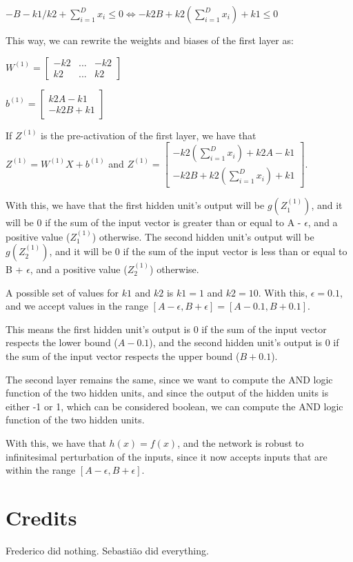 \documentclass{article}
\begin{document}
\bigskip

$ -B - k1/k2 + \sum_{i=1}^{D} x_i \leq 0 \iff -k2B + k2(\sum_{i=1}^{D} x_i) + k1 \leq 0$

\bigskip

This way, we can rewrite the weights and biases of the first layer as:

\bigskip

\( W^{(1)} = \begin{bmatrix}
    -k2 & ...  & -k2\\
    k2 & ... & k2
\end{bmatrix}
\)

\bigskip

\(b^{(1)} = \begin{bmatrix}
    k2A - k1 \\
    -k2B + k1
\end{bmatrix}
\)

\bigskip

If $Z^{(1)}$ is the pre-activation of the first layer, we have that $Z^{(1)} = W^{(1)}X + b^{(1)}$ and
$Z^{(1)} = \begin{bmatrix}
    -k2(\sum_{i=1}^{D} x_i) + k2A - k1\\
    -k2B + k2(\sum_{i=1}^{D} x_i) + k1
\end{bmatrix}
$.

\bigskip

With this, we have that the first hidden unit's output will be $g(Z^{(1)}_1)$, and it will be 0 if the sum of the 
input vector is greater than or equal to A - $\epsilon$, and a positive value ($Z^{(1)}_1$) otherwise. 
The second hidden unit's output will be $g(Z^{(1)}_2)$, and it will be 0 if the sum of the input vector is less than or equal 
to B + $\epsilon$, and a positive value ($Z^{(1)}_2$) otherwise.

A possible set of values for $k1$ and $k2$ is $k1 = 1$ and $k2 = 10$. With this, $\epsilon = 0.1$, and we accept values in
the range $[A - \epsilon, B + \epsilon] = [A - 0.1, B + 0.1]$.

This means the first hidden unit's output is 0 if the sum of the input vector respects the lower bound ($A - 0.1$),
and the second hidden unit's output is 0 if the sum of the input vector respects the upper bound ($B + 0.1$).

\bigskip

The second layer remains the same, since we want to compute the AND logic function of the two hidden units, and since the output of
the hidden units is either -1 or 1, which can be considered boolean, we can compute the AND logic function of the two hidden units.

With this, we have that \(h(x) = f(x)\), and the network is robust to infinitesimal perturbation of the inputs, since it now accepts inputs
that are within the range \([A - \epsilon, B + \epsilon]\).

\section{Credits}

Frederico did nothing.
Sebastião did everything.
\end{document}
